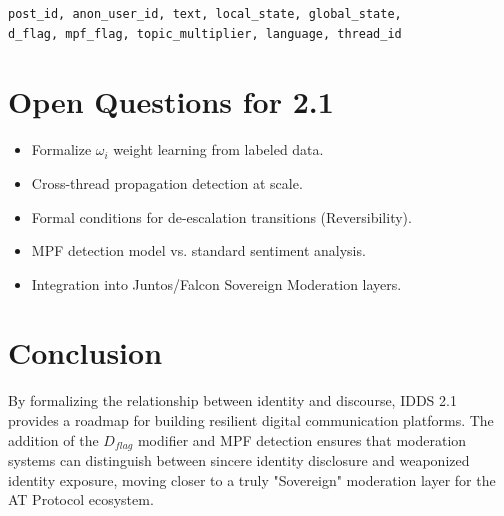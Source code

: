 \documentclass[11pt,a4paper]{article}
\begin{document}
\begin{verbatim}
post_id, anon_user_id, text, local_state, global_state, 
d_flag, mpf_flag, topic_multiplier, language, thread_id
\end{verbatim}

\section{Open Questions for 2.1}
\begin{itemize}
    \item Formalize $\omega_i$ weight learning from labeled data.
    \item Cross-thread propagation detection at scale.
    \item Formal conditions for de-escalation transitions (Reversibility).
    \item MPF detection model vs. standard sentiment analysis.
    \item Integration into Juntos/Falcon Sovereign Moderation layers.
\end{itemize}

\section{Conclusion}
By formalizing the relationship between identity and discourse, IDDS 2.1 provides a roadmap for building resilient digital communication platforms. The addition of the $D_{flag}$ modifier and MPF detection ensures that moderation systems can distinguish between sincere identity disclosure and weaponized identity exposure, moving closer to a truly "Sovereign" moderation layer for the AT Protocol ecosystem.
\end{document}
